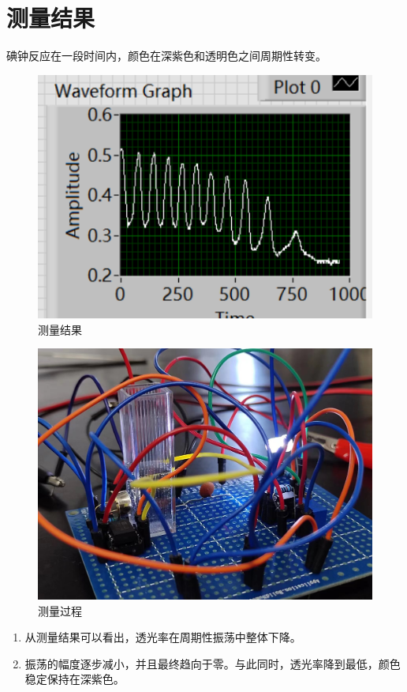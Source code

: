 \documentclass[UTF8]{ctexart}
\begin{document}
\section{测量结果}
碘钟反应在一段时间内，颜色在深紫色和透明色之间周期性转变。
\begin{figure}
    \centering
    \includegraphics[width=0.75\linewidth]{检测结果1.png}
    \caption{测量结果}
    \label{测量结果}

\end{figure}
\begin{figure}
    \centering
    \includegraphics[width=0.75\linewidth]{测量过程.jpg}
    \caption{测量过程}
    \label{测量过程}
\end{figure}
\begin{enumerate}
    \item 从测量结果可以看出，透光率在周期性振荡中整体下降。
    \item 振荡的幅度逐步减小，并且最终趋向于零。与此同时，透光率降到最低，颜色稳定保持在深紫色。
\end{enumerate}
\end{document}
